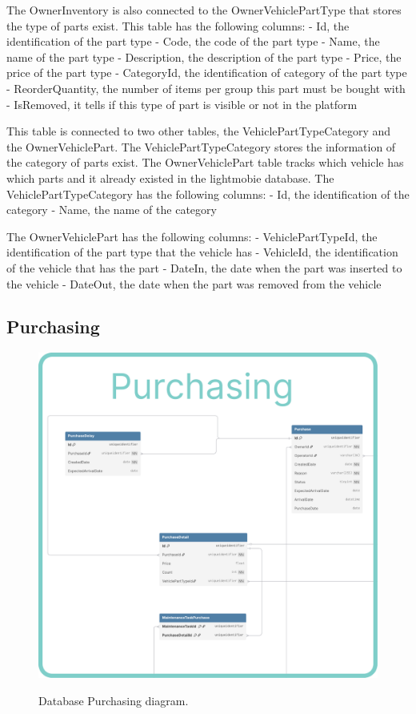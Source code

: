 The OwnerInventory is also connected to the OwnerVehiclePartType that stores the type of parts exist.
This table has the following columns:
- Id, the identification of the part type
- Code, the code of the part type
- Name, the name of the part type
- Description, the description of the part type
- Price, the price of the part type
- CategoryId, the identification of category of the part type
- ReorderQuantity, the number of items per group this part must be bought with
- IsRemoved, it tells if this type of part is visible or not in the platform

This table is connected to two other tables, the VehiclePartTypeCategory and the OwnerVehiclePart.
The VehiclePartTypeCategory stores the information of the category of parts exist. 
The OwnerVehiclePart table tracks which vehicle has which parts and it already existed in the lightmobie database.
The VehiclePartTypeCategory has the following columns:
- Id, the identification of the category
- Name, the name of the category

The OwnerVehiclePart has the following columns:
- VehiclePartTypeId, the identification of the part type that the vehicle has
- VehicleId, the identification of the vehicle that has the part
- DateIn, the date when the part was inserted to the vehicle
- DateOut, the date when the part was removed from the vehicle



\subsection{Purchasing} 


\begin{figure}[h]
  \caption{Database Purchasing diagram.}
  \centering
  \includegraphics[width=\textwidth]{figs/dbDiagrams/Purchasing}
  \label{fig:figure2}
\end{figure}


